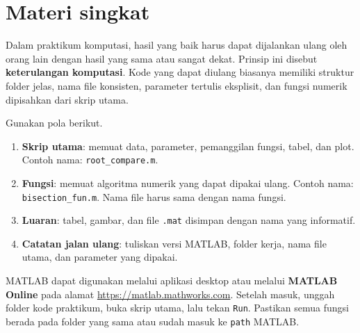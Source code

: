 \documentclass[book,english,noindex,lean,nobackpage,nocopyright,noupdate,nofiglist,notablist]{enacom}
\begin{document}
\section{Materi singkat}
Dalam praktikum komputasi, hasil yang baik harus dapat dijalankan ulang oleh orang lain dengan hasil yang sama atau sangat dekat. Prinsip ini disebut \textbf{keterulangan komputasi}. Kode yang dapat diulang biasanya memiliki struktur folder jelas, nama file konsisten, parameter tertulis eksplisit, dan fungsi numerik dipisahkan dari skrip utama.

Gunakan pola berikut.
\begin{enumerate}
\item \textbf{Skrip utama}: memuat data, parameter, pemanggilan fungsi, tabel, dan plot. Contoh nama: \texttt{root\_compare.m}.
\item \textbf{Fungsi}: memuat algoritma numerik yang dapat dipakai ulang. Contoh nama: \texttt{bisection\_fun.m}. Nama file harus sama dengan nama fungsi.
\item \textbf{Luaran}: tabel, gambar, dan file \texttt{.mat} disimpan dengan nama yang informatif.
\item \textbf{Catatan jalan ulang}: tuliskan versi MATLAB, folder kerja, nama file utama, dan parameter yang dipakai.
\end{enumerate}

MATLAB dapat digunakan melalui aplikasi desktop atau melalui \textbf{MATLAB Online} pada alamat \url{https://matlab.mathworks.com}. Setelah masuk, unggah folder kode praktikum, buka skrip utama, lalu tekan \texttt{Run}. Pastikan semua fungsi berada pada folder yang sama atau sudah masuk ke \texttt{path} MATLAB.
\end{document}
